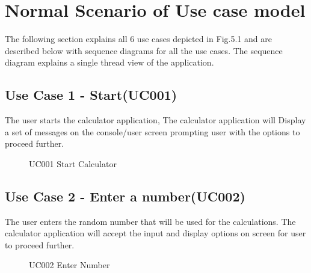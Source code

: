 \documentclass[12pt, a4paper]{report}
\begin{document}
\section{Normal Scenario of Use case model}
\quad The following section explains all 6 use cases depicted in Fig.5.1 and are described below with sequence diagrams for all the use cases. The sequence diagram explains a single thread view of the application.
\subsection{Use Case 1 - Start(UC001)}
\quad The user starts the calculator application, The calculator application will Display a set of messages on the console/user screen prompting user with the options to proceed further.
\begin{figure}[h]
    \centering
    \caption{UC001 Start Calculator}
    \label{fig:UC001 Start Calculator}
\end{figure}

\subsection{Use Case 2 - Enter a number(UC002)}
\quad The user enters the random number that will be used for the calculations. The calculator application will accept the input and display options on screen for user to proceed further.
\begin{figure}[!h]
    \centering
    \caption{UC002 Enter Number}
    \label{fig:UC002 Enter Number}
\end{figure}
\end{document}
